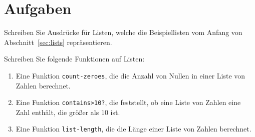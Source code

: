 \section*{Aufgaben}

\begin{aufgabe}
  Schreiben Sie Ausdrücke für Listen, welche die Beispiellisten vom
  Anfang von Abschnitt~\ref{sec:lists} repräsentieren.
\end{aufgabe}

\begin{aufgabe}
Schreiben Sie folgende Funktionen auf Listen:
  
  \begin{enumerate} 
    
  \item Eine Funktion \texttt{count-zeroes}, die die Anzahl von Nullen
    in einer Liste von Zahlen berechnet.
    
  \item Eine Funktion \texttt{contains>10?}, die feststellt, ob eine
    Liste von Zahlen eine Zahl enthält, die größer als 10 ist.
    
  \item Eine Funktion \texttt{list-length}, die die Länge einer Liste
    von Zahlen berechnet.

  \end{enumerate}
  
\end{aufgabe}

